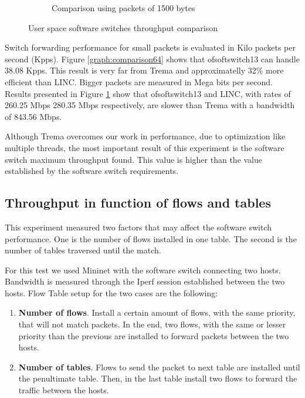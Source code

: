 \begin{figure}[H]
\begin{minipage}{\textwidth}
\begin{subfigure}{.7\textwidth}
            \caption{Comparison using packets of 1500 bytes}
            \label{graph:comparison1500}
        \end{subfigure}
        \end{minipage}
        \caption{User space software switches throughput comparison}
        \label{graph:comparison}
    \end{figure}
  
   Switch forwarding performance for small packets is evaluated in Kilo packets per second (Kpps). Figure \ref{graph:comparison64} shows that ofsoftswitch13 can handle 38.08 Kpps. This result is very 
   far from Trema and approximatelly 32\% more efficient than LINC. Bigger packets are measured in Mega bits per second. Results presented in Figure \ref{graph:comparison1500} show that ofsoftswitch13 and LINC, with rates of 260.25 Mbps 280.35 Mbps respectively, are slower than Trema with a bandwidth of 843.56 Mbps. 
   
    Although Trema overcomes our work in performance, due to optimization like multiple threads, the most important result of this experiment is the software switch maximum throughput found. This value is higher than the value established by the software switch requirements. 
    
    \subsection{Throughput in function of flows and tables}
    \label{sec:bandflows}
    This experiment measured two factors that may affect the software switch performance. One is the number of flows installed in one table. The second is the number of tables traversed until the match.
    
    For this test we used Mininet with the software switch connecting two hosts. Bandwidth is measured through the  Iperf session established between the two hosts. Flow Table setup for the two cases are the following: 
    
    \begin{enumerate}[label=(\Alph*)]
    \item \textbf{Number of flows}. Install a certain amount of flows, with the same priority, that will not match packets. In the end, two flows, with the same or lesser priority than the previous are installed to forward packets between the two hosts.
    \item \textbf{Number of tables}. Flows to send the packet to next table are installed until the penultimate  table. Then, in the last table install two flows to forward the traffic between the hosts.
    \end{enumerate}
    
